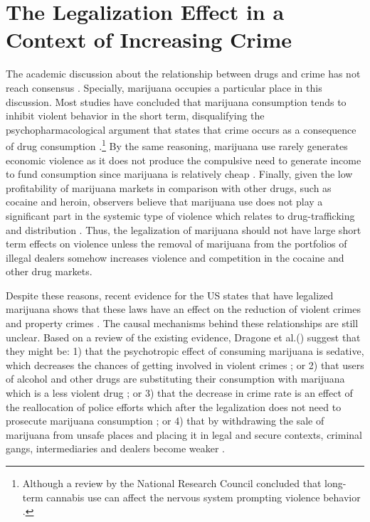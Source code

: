 \documentclass[11pt]{article}
\begin{document}
\section{The Legalization Effect in a Context of Increasing Crime}
The academic discussion about the relationship between drugs and crime has not reach consensus \citep{white2000dynamics}. Specially, marijuana occupies a particular place in this discussion. Most studies have concluded that marijuana consumption tends to inhibit violent behavior in the short term, disqualifying the psychopharmacological argument \citep{white2000dynamics} that states that crime occurs as a consequence of drug consumption \citep{goldstein1985drugs}.\footnote{Although a review by the National Research Council concluded that long-term cannabis use can affect the nervous system prompting violence behavior \citep{national1994understanding}.} By the same reasoning, marijuana use rarely generates economic violence as it does not produce the compulsive need to generate income to fund consumption since marijuana is relatively cheap \citep{caulkins2016marijuana}. Finally, given the low profitability of marijuana markets in comparison with other drugs, such as cocaine and heroin, observers believe that marijuana use does not play a significant part in the systemic type of violence \citep{pacula2003marijuana, caulkins2015considering} which relates to drug-trafficking and distribution \citep{goldstein1985drugs}. Thus, the legalization of marijuana should not have large short term effects on violence unless the removal of marijuana from the portfolios of illegal dealers somehow increases violence and competition in the cocaine and other drug markets.

Despite these reasons, recent evidence for the US states that have legalized marijuana shows that these laws have an effect on the reduction of violent crimes and property crimes \citep{dragone2019crime, Indigo:2016, gavrilova2014legal, huber2016cannabis, brinkman2017not}. The causal mechanisms behind these relationships are still unclear. Based on a review of the existing evidence, Dragone et al.(\citeyear{dragone2019crime}) suggest that they might be: 1) that the psychotropic effect of consuming marijuana is sedative, which decreases the chances of getting involved in violent crimes \citep{no2001health, green2003being}; or 2) that users of alcohol and other drugs are substituting their consumption with marijuana which is a less violent drug \citep{anderson2014legalization, kelly2014policing} ; or 3) that the decrease in crime rate is an effect of the reallocation of police efforts which after the legalization does not need to prosecute marijuana consumption \citep{adda2014crime}; or 4) that by withdrawing the sale of marijuana from unsafe places and placing it in legal and secure contexts, criminal gangs, intermediaries and dealers become weaker \citep{becker2013have}. 
\end{document}

